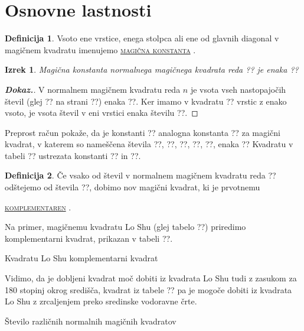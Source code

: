 \documentclass[a4paper,12pt]{article}
\theoremstyle{definition}
\newtheorem{defn}{Definicija}
\theoremstyle{plain}
\newtheorem{thrm}{Izrek}
\newenvironment{dokaz}{
   \begin{proof}[\textnormal{\textbf{Dokaz.}}]
   }{
   \end{proof}
   }
\newcommand{\pojem}[1]{
   \underline{\textsc{#1}}
}
\begin{document}

\section{Osnovne lastnosti}

\begin{defn}

   Vsoto ene vrstice, enega stolpca ali ene od glavnih diagonal
   v magičnem kvadratu imenujemo \pojem{magična konstanta}.

\end{defn}

\begin{thrm}

   Magična konstanta normalnega magičnega kvadrata reda ??
   je enaka
   ??

\end{thrm}

\begin{dokaz}
   V normalnem magičnem kvadratu reda $n$ je vsota vseh nastopajočih
   števil (glej ?? na strani ??) enaka
   ??. Ker imamo
   v kvadratu ?? vrstic z enako vsoto, je vsota števil v eni vrstici
   enaka številu ??.
\end{dokaz}

Preprost račun pokaže, da je konstanti ?? analogna konstanta
?? za magični kvadrat, v katerem so nameščena števila
??, ??, ??, ??, ??, enaka
??
Kvadratu v tabeli ?? ustrezata konstanti ?? in ??.

\begin{defn}
   Če vsako od števil v normalnem magičnem kvadratu reda ?? odštejemo
   od števila ??, dobimo nov magični kvadrat, ki je prvotnemu
   \pojem{komplementaren}.
\end{defn}

Na primer, magičnemu kvadratu Lo Shu (glej tabelo ??) priredimo
komplementarni kvadrat, prikazan v tabeli ??.

Kvadratu Lo Shu komplementarni kvadrat

Vidimo, da je dobljeni kvadrat moč dobiti iz kvadrata Lo Shu tudi z zasukom za
180 stopinj okrog središča, kvadrat iz tabele ?? pa je mogoče dobiti
iz kvadrata Lo Shu z zrcaljenjem preko sredinske vodoravne črte.

Število različnih normalnih magičnih kvadratov
\end{document}
